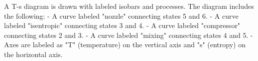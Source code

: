 A T-s diagram is drawn with labeled isobars and processes. The diagram includes the following:  
- A curve labeled "nozzle" connecting states 5 and 6.  
- A curve labeled "isentropic" connecting states 3 and 4.  
- A curve labeled "compressor" connecting states 2 and 3.  
- A curve labeled "mixing" connecting states 4 and 5.  
- Axes are labeled as "T" (temperature) on the vertical axis and "s" (entropy) on the horizontal axis.